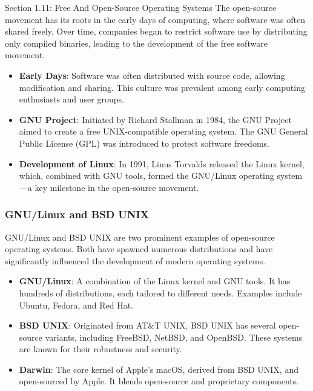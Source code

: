 \begin{notes}{Section 1.11: Free And Open-Source Operating Systems}
    The open-source movement has its roots in the early days of computing, where software was often shared freely. Over time, companies began to restrict software use by distributing only compiled 
    binaries, leading to the development of the free software movement.
    
    \begin{highlight}
    
    \begin{itemize}
        \item \textbf{Early Days}: Software was often distributed with source code, allowing modification and sharing. This culture was prevalent among early computing enthusiasts and user groups.
        \item \textbf{GNU Project}: Initiated by Richard Stallman in 1984, the GNU Project aimed to create a free UNIX-compatible operating system. The GNU General Public License (GPL) was introduced 
        to protect software freedoms.
        \item \textbf{Development of Linux}: In 1991, Linus Torvalds released the Linux kernel, which, combined with GNU tools, formed the GNU/Linux operating system—a key milestone in the open-source movement.
    \end{itemize}
    
    \end{highlight}
    
    \subsubsection*{GNU/Linux and BSD UNIX}
    
    GNU/Linux and BSD UNIX are two prominent examples of open-source operating systems. Both have spawned numerous distributions and have significantly influenced the development of modern operating systems.
    
    \begin{highlight}
    
    \begin{itemize}
        \item \textbf{GNU/Linux}: A combination of the Linux kernel and GNU tools. It has hundreds of distributions, each tailored to different needs. Examples include Ubuntu, Fedora, and Red Hat.
        \item \textbf{BSD UNIX}: Originated from AT&T UNIX, BSD UNIX has several open-source variants, including FreeBSD, NetBSD, and OpenBSD. These systems are known for their robustness and security.
        \item \textbf{Darwin}: The core kernel of Apple’s macOS, derived from BSD UNIX, and open-sourced by Apple. It blends open-source and proprietary components.
    \end{itemize}
    

\end{highlight}
\end{notes}
